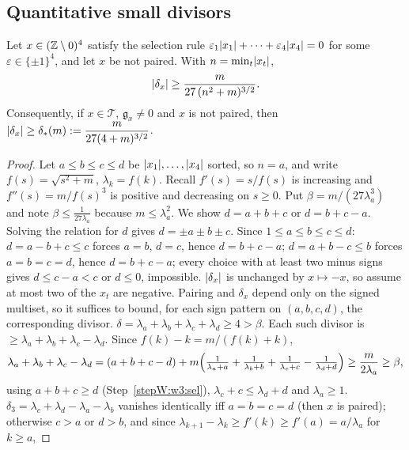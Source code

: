 \subsection{Quantitative small divisors}\label{bpW:w3:divisor-sec}

\begin{lemma}\label{bpW:w3:divisor}
Let $x\in(\mathbb{Z}\setminus0)^4$ satisfy the selection rule $\varepsilon_1\lvert x_1\rvert+\dots+\varepsilon_4\lvert x_4\rvert=0$ for
some $\varepsilon\in\{\pm1\}^4$, and let $x$ be not paired. With $n=\min_t\lvert x_t\rvert$,
\[\lvert \delta_x\rvert\ge\frac{m}{27\,(n^2+m)^{3/2}}.\]
Consequently, if $x\in\mathcal T$, $\mathfrak g_x\ne0$ and $x$ is not paired, then
$\lvert \delta_x\rvert\ge\delta_*(m):=\dfrac{m}{27(4+m)^{3/2}}$.
\end{lemma}

\begin{proof}
Let $a\le b\le c\le d$ be $\lvert x_1\rvert,\dots,\lvert x_4\rvert$ sorted, so $n=a$, and write $f(s)=\sqrt{s^2+m}$,
$\lambda_k=f(k)$. Recall $f'(s)=s/f(s)$ is increasing and $f''(s)=m/f(s)^3$ is positive and decreasing on
$s\ge0$. Put $\beta=m/(27\lambda_a^3)$ and note $\beta\le\frac1{27\lambda_a}$ because $m\le\lambda_a^2$.
\label{stepW:w3:sel}
We show $d=a+b+c$ or $d=b+c-a$. Solving the relation for $d$ gives $d=\pm a\pm b\pm c$. Since $1\le a\le b\le c\le d$:
$d=a-b+c\le c$ forces $a=b$, $d=c$, hence $d=b+c-a$; $d=a+b-c\le b$ forces $a=b=c=d$, hence $d=b+c-a$; every
choice with at least two minus signs gives $d\le c-a<c$ or $d\le0$, impossible.
\label{stepW:w3:signs}
$\lvert \delta_x\rvert$ is unchanged by $x\mapsto-x$, so assume at most two of the $x_t$ are negative. Pairing and $\delta_x$
depend only on the signed multiset, so it suffices to bound, for each sign pattern on $(a,b,c,d)$, the
corresponding divisor.
\label{stepW:w3:s0}
$\delta=\lambda_a+\lambda_b+\lambda_c+\lambda_d\ge4>\beta$.
\label{stepW:w3:s1}
Each such divisor is $\ge\lambda_a+\lambda_b+\lambda_c-\lambda_d$. Since $f(k)-k=m/(f(k)+k)$,
\[\lambda_a+\lambda_b+\lambda_c-\lambda_d=(a+b+c-d)+m\Bigl(\tfrac1{\lambda_a+a}+\tfrac1{\lambda_b+b}+\tfrac1{\lambda_c+c}-\tfrac1{\lambda_d+d}\Bigr)
\ge\frac{m}{2\lambda_a}\ge\beta,\]
using $a+b+c\ge d$ (Step~\ref{stepW:w3:sel}), $\lambda_c+c\le\lambda_d+d$ and $\lambda_a\ge1$.
\label{stepW:w3:s23}
$\delta_3=\lambda_c+\lambda_d-\lambda_a-\lambda_b$ vanishes identically iff $a=b=c=d$ (then $x$ is paired);
otherwise $c>a$ or $d>b$, and since $\lambda_{k+1}-\lambda_k\ge f'(k)\ge f'(a)=a/\lambda_a$ for $k\ge a$,

\end{proof}

